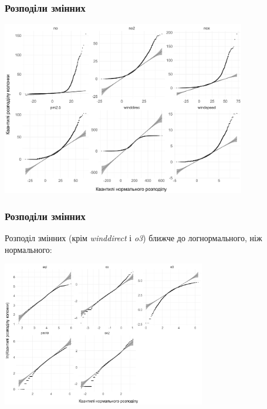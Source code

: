 \documentclass{beamer}
\begin{document}
\begin{frame}
  \frametitle{Розподіли змінних}

  \begin{center}
    \includegraphics[height=3in]{plots/qq_tidy/qq-p2.png}
  \end{center}
\end{frame}

\begin{frame}
  \frametitle{Розподіли змінних}

  Розподіл змінних (крім \textit{winddirect} і \textit{o3}) ближче до логнормального, ніж нормального:

  \begin{center}
    \includegraphics[height=2.5in]{plots/qq_tidy/qq-log-p1.png}
  \end{center}
\end{frame}
\end{document}
